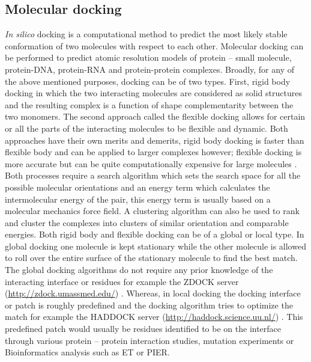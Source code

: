 		\subsection{Molecular docking}
		\label{sec:Docking}
		\textit{In silico} docking is a computational method to predict the most likely stable conformation of two molecules with respect to each other. Molecular docking can be performed to predict atomic resolution models of protein – small molecule, protein-DNA, protein-RNA and protein-protein complexes. Broadly, for any of the above mentioned purposes, docking can be of two types. First, rigid body docking in which the two interacting molecules are considered as solid structures and the resulting complex is a function of shape complementarity between the two monomers. The second approach called the flexible docking allows for certain or all the parts of the interacting molecules to be flexible and dynamic. Both approaches have their own merits and demerits, rigid body docking is faster than flexible body and can be applied to larger complexes however; flexible docking is more accurate but can be quite computationally expensive for large molecules \parencite{Teague2003}. Both processes require a search algorithm which sets the search space for all the possible molecular orientations and an energy term which calculates the intermolecular energy of the pair, this energy term is usually based on a molecular mechanics force field. A clustering algorithm can also be used to rank and cluster the complexes into clusters of similar orientation and comparable energies. Both rigid body and flexible docking can be of a global or local type. In global docking one molecule is kept stationary while the other molecule is allowed to roll over the entire surface of the stationary molecule to find the best match. The global docking algorithms do not require any prior knowledge of the interacting interface or residues for example the ZDOCK server (\url{http://zdock.umassmed.edu/}) \parencite{Pierce2014}. Whereas, in local docking the docking interface or patch is roughly predefined and the docking algorithm tries to optimize the match for example the HADDOCK server (\url{http://haddock.science.uu.nl/}) \parencite{DeVries2010}. This predefined patch would usually be residues identified to be on the interface through various protein – protein interaction studies, mutation experiments or Bioinformatics analysis such as ET or PIER.
		
